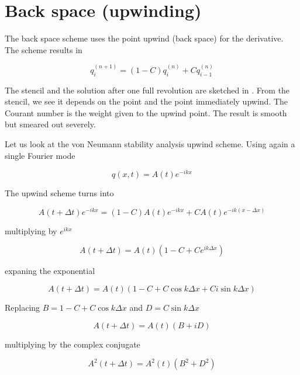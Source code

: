 \section{Back space (upwinding)}

The back space scheme uses the point upwind
(back space) for the derivative. The scheme results in 

\begin{equation}
q^{(n+1)}_i  = (1-C) q^{(n)}_i + Cq^{(n)}_{i-1}
\end{equation}

The stencil and the solution after one full revolution are sketched in
. From the stencil, we see it depends on the point and the point immediately upwind. The Courant number is the weight given to the upwind point. The result is smooth but smeared out severely.

Let us look at the von Neumann stability analysis upwind scheme. Using again a single Fourier mode 

\begin{equation}
q(x,t) = A(t) e^{-ikx}
\end{equation}

The upwind scheme turns into

\begin{equation}
A(t+\Delta t)e^{-ikx}  = (1-C) A(t)e^{-ikx} + CA(t)e^{-ik(x-\Delta x)}
\end{equation}

multiplying by $e^{ikx}$

\begin{equation}
A(t+\Delta t)  = A(t) \left(1 - C  +C e^{ik\Delta x}\right)
\end{equation}


expaning the exponential 

\begin{equation}
A(t+\Delta t)  = A(t) \left(1 - C + C\cos k\Delta x + C i\sin k\Delta x\right)
\end{equation}

Replacing $B = 1 - C + C\cos k\Delta x$ and $D = C\sin k\Delta x$

\begin{equation}
A(t+\Delta t)  = A(t) \left(B + iD\right)
\end{equation}

multiplying by the complex conjugate 

\begin{equation}
A^2(t+\Delta t)  = A^2(t) \left(B^2  + D^2\right)
\end{equation}

